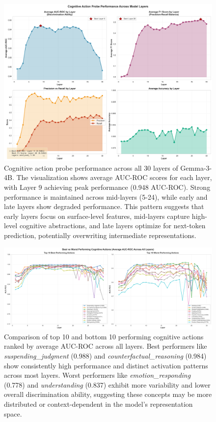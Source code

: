 \documentclass[letterpaper]{article}
\begin{document}
\begin{figure}[t]
\centering
\includegraphics[width=\textwidth]{../data/cognitive_probe_performance_by_layer.png}
\caption{Cognitive action probe performance across all 30 layers of Gemma-3-4B. The visualization shows average AUC-ROC scores for each layer, with Layer 9 achieving peak performance (0.948 AUC-ROC). Strong performance is maintained across mid-layers (5-24), while early and late layers show degraded performance. This pattern suggests that early layers focus on surface-level features, mid-layers capture high-level cognitive abstractions, and late layers optimize for next-token prediction, potentially overwriting intermediate representations.}
\label{fig:layer_performance}
\end{figure}

\begin{figure}[t]
\centering
\includegraphics[width=\textwidth]{../data/best_worst_actions.png}
\caption{Comparison of top 10 and bottom 10 performing cognitive actions ranked by average AUC-ROC across all layers. Best performers like \textit{suspending\_judgment} (0.988) and \textit{counterfactual\_reasoning} (0.984) show consistently high performance and distinct activation patterns across most layers. Worst performers like \textit{emotion\_responding} (0.778) and \textit{understanding} (0.837) exhibit more variability and lower overall discrimination ability, suggesting these concepts may be more distributed or context-dependent in the model's representation space.}
\label{fig:best_worst}
\end{figure}
\end{document}
